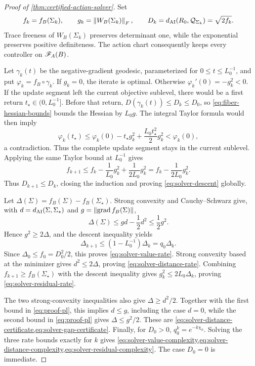 \begin{proof}[Proof of \cref{thm:certified-action-solver}]
Set
\[
  f_k=f_B(\Sigma_k),\qquad
  g_k=\left\lVert W_B(\Sigma_k)\right\rVert_F,\qquad
  D_k=d_{\mathrm{AI}}(R_0,\mathcal Q_{\Sigma_k})=\sqrt{2f_k}.
\]
Trace freeness of
\(W_B(\Sigma_k)\) preserves determinant one, while the exponential preserves
positive definiteness.  The action chart consequently keeps every controller
on \(\mathscr F_A(B)\).

Let \(\gamma_k(t)\) be the negative-gradient geodesic, parameterized for
\(0\le t\le L_0^{-1}\), and put
\(\varphi_k=f_B\circ\gamma_k\).  If \(g_k=0\), the iterate is optimal.
Otherwise \(\varphi_k'(0)=-g_k^2<0\).  If the update segment left the
current objective sublevel, there would be a first return
\(t_\star\in(0,L_0^{-1}]\).  Before that return,
\(D(\gamma_k(t))\le D_k\le D_0\), so
\eqref{eq:fiber-hessian-bounds} bounds the Hessian by \(L_0g\).  The
integral Taylor formula would then imply
\[
  \varphi_k(t_\star)
  \le\varphi_k(0)-t_\star g_k^2
      +\frac{L_0t_\star^2}{2}g_k^2
  <\varphi_k(0),
\]
a contradiction.  Thus the complete update segment stays in the current
sublevel.  Applying the same Taylor bound at \(L_0^{-1}\) gives
\[
  f_{k+1}\le f_k-\frac1{L_0}g_k^2
  +\frac1{2L_0}g_k^2
  =f_k-\frac1{2L_0}g_k^2.
\]
Thus \(D_{k+1}\le D_k\), closing the induction and proving
\cref{eq:solver-descent} globally.

Let \(\Delta(\Sigma)=f_B(\Sigma)-f_B(\Sigma_\star)\).  Strong convexity
and Cauchy--Schwarz give, with
\(d=d_{\mathrm{AI}}(\Sigma,\Sigma_\star)\) and
\(g=\left\lVert \operatorname{grad}f_B(\Sigma)\right\rVert\),
\begin{equation}
  \Delta(\Sigma)\le gd-\frac12d^2\le\frac12g^2.
  \label{eq:proof-pl}
\end{equation}
Hence \(g^2\ge2\Delta\), and the descent inequality yields
\[
  \Delta_{k+1}\le(1-L_0^{-1})\Delta_k=q_0\Delta_k.
\]
Since \(\Delta_0\le f_0=D_0^2/2\), this proves
\cref{eq:solver-value-rate}.  Strong convexity based at the minimizer gives
\(d^2\le2\Delta\), proving \cref{eq:solver-distance-rate}.  Combining
\(f_{k+1}\ge f_B(\Sigma_\star)\) with the descent inequality gives
\(g_k^2\le2L_0\Delta_k\), proving
\cref{eq:solver-residual-rate}.

The two strong-convexity inequalities also give
\(\Delta\ge d^2/2\).  Together with the first bound in
\eqref{eq:proof-pl}, this implies \(d\le g\), including the case \(d=0\),
while the second bound in \eqref{eq:proof-pl} gives
\(\Delta\le g^2/2\).  These are
\cref{eq:solver-distance-certificate,eq:solver-gap-certificate}.
Finally, for \(D_0>0\),
\(q_0^k=e^{-k\chi_0}\).  Solving the three rate bounds exactly for \(k\)
gives
\cref{eq:solver-value-complexity,eq:solver-distance-complexity,eq:solver-residual-complexity}.
The case \(D_0=0\) is immediate.
\end{proof}

